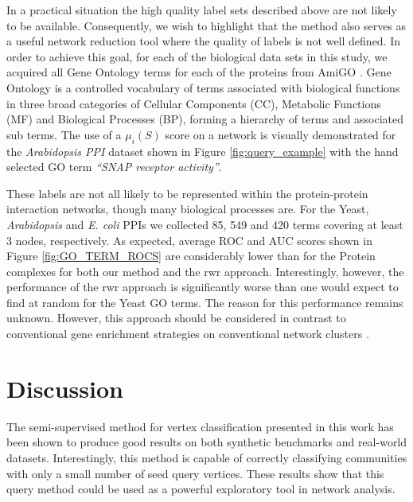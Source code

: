 \documentclass[sigconf]{acmart}
\begin{document}
In a practical situation the high quality label sets described above are not likely to be available.
Consequently, we wish to highlight that the method also serves as a useful network reduction tool where the quality of labels is not well defined.
In order to achieve this goal, for each of the biological data sets in this study, we acquired all Gene Ontology terms for each of the proteins from AmiGO \cite{carbon2008amigo}.
Gene Ontology is a controlled vocabulary of terms associated with biological functions in three broad categories of Cellular Components (CC),  Metabolic Functions (MF) and Biological Processes (BP), forming a hierarchy of terms and associated sub terms.
The use of a $\mu_i(S)$ score on a network is visually demonstrated for the \textit{Arabidopsis PPI} dataset shown in Figure \ref{fig:query_example} with the hand selected GO term \textit{``SNAP receptor activity''}.

These labels are not all likely to be represented within the protein-protein interaction networks, though many biological processes are.
For the Yeast, \textit{Arabidopsis} and \textit{E. coli} PPIs we collected 85, 549 and 420 terms covering at least 3 nodes, respectively.
As expected, average ROC and AUC scores shown in Figure \ref{fig:GO_TERM_ROCS} are considerably lower than for the Protein complexes for both our method and the rwr approach. 
Interestingly, however, the performance of the rwr approach is significantly worse than one would expect to find at random for the Yeast GO terms.
The reason for this performance remains unknown.
However, this approach should be considered in contrast to conventional gene enrichment strategies on conventional network clusters \cite{chen2013enrichr}.

\section{Discussion}
The semi-supervised method for vertex classification presented in this work has been shown to produce good results on both synthetic benchmarks and real-world datasets.
Interestingly, this method is capable of correctly classifying communities with only a small number of seed query vertices.
These results show that this query method could be used as a powerful exploratory tool in network analysis.
\end{document}
